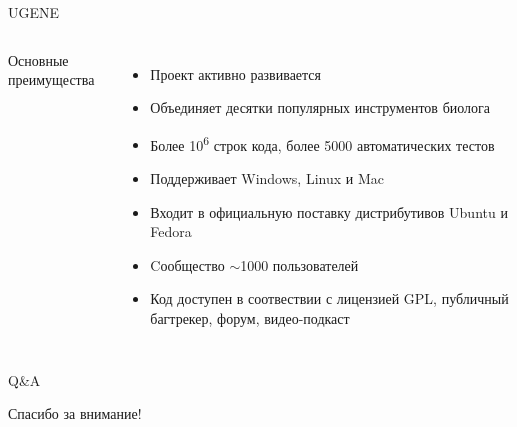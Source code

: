 \documentclass[utf8, professionalfonts]{beamer}
\begin{document}
\begin{frame}{UGENE}

\begin{columns}[c]
	Основные преимущества
	\begin{itemize}
		\item Проект активно развивается
		\item Объединяет десятки популярных инструментов биолога
		\item Более 10\textsuperscript{6} строк кода, более 5000 автоматических тестов
		\item Поддерживает Windows, Linux и Mac
		\item Входит в официальную поставку дистрибутивов Ubuntu и Fedora
		\item Cообщество $\sim$1000 пользователей
		\item Код доступен в соотвествии с лицензией GPL, публичный багтрекер, форум, видео-подкаст
	\end{itemize}
	
	
\end{columns}

\end{frame}

\begin{frame}
\end{frame}

\begin{frame}{Q\&A}
\begin{center} 
\LARGE{Спасибо за внимание!}
\end{center}
\end{frame}
\end{document}
